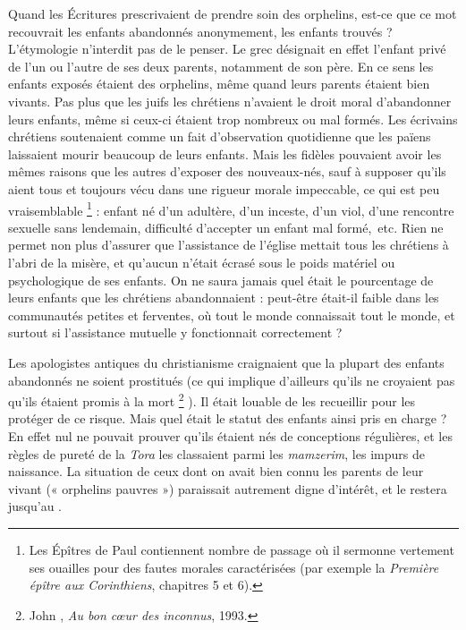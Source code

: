 Quand les Écritures prescrivaient de prendre soin des orphelins, est-ce que ce mot recouvrait les enfants abandonnés anonymement, les enfants trouvés ? L'étymologie n'interdit pas de le penser. Le grec  désignait en effet l'enfant privé de l'un ou l'autre de ses deux parents, notamment de son père. En ce sens les enfants exposés étaient des orphelins, même quand leurs parents étaient bien vivants. Pas plus que les juifs les chrétiens n'avaient le droit moral d'abandonner leurs enfants, même si ceux-ci étaient trop nombreux ou mal formés. Les écrivains chrétiens soutenaient comme un fait d'observation quotidienne que les païens laissaient mourir beaucoup de leurs enfants. Mais les fidèles pouvaient avoir les mêmes raisons que les autres d'exposer des nouveaux-nés, sauf à supposer qu'ils aient tous et toujours vécu dans une rigueur morale impeccable, ce qui est peu vraisemblable%
\footnote{Les Épîtres de Paul contiennent nombre de passage où il sermonne vertement ses ouailles pour des fautes morales caractérisées (par exemple la \emph{Première épître aux Corinthiens}, chapitres 5 et 6).} 
: enfant né d'un adultère, d'un inceste, d'un viol, d'une rencontre sexuelle sans lendemain, difficulté d'accepter un enfant mal formé,~etc. Rien ne permet non plus d'assurer que l'assistance de l'église mettait tous les chrétiens à l'abri de la misère, et qu'aucun n'était écrasé sous le poids matériel ou psychologique de ses enfants. On ne saura jamais quel était le pourcentage de leurs enfants que les chrétiens abandonnaient : peut-être était-il faible dans les communautés petites et ferventes, où tout le monde connaissait tout le monde, et surtout si l'assistance mutuelle y fonctionnait correctement ? 

 Les apologistes antiques du christianisme craignaient que la plupart des enfants abandonnés ne soient prostitués (ce qui implique d'ailleurs qu'ils ne croyaient pas qu'ils étaient promis à la mort%
\footnote{John , \emph{Au bon cœur des inconnus}, 1993.}%
). Il était louable de les recueillir pour les protéger de ce risque. Mais quel était le statut des enfants ainsi pris en charge ? En effet nul ne pouvait prouver qu'ils étaient nés de conceptions régulières, et les règles de pureté de la \emph{Tora} les classaient parmi les \emph{mamzerim}, les impurs de naissance. La situation de ceux dont on avait bien connu les parents de leur vivant (« orphelins pauvres ») paraissait autrement digne d'intérêt, et le restera jusqu'au . 

